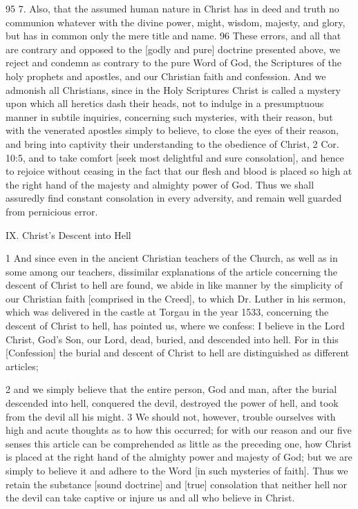 {95 7. Also, that the assumed human nature in Christ has in deed and truth no communion whatever with the divine power, might, wisdom, majesty, and glory, but has in common only the mere title and name.
96 These errors, and all that are contrary and opposed to the [godly and pure] doctrine presented above, we reject and condemn as contrary to the pure Word of God, the Scriptures of the holy prophets and apostles, and our Christian faith and confession. And we admonish all Christians, since in the Holy Scriptures Christ is called a mystery upon which all heretics dash their heads, not to indulge in a presumptuous manner in subtile inquiries, concerning such mysteries, with their reason, but with the venerated apostles simply to believe, to close the eyes of their reason, and bring into captivity their understanding to the obedience of Christ, 2 Cor. 10:5, and to take comfort [seek most delightful and sure consolation], and hence to rejoice without ceasing in the fact that our flesh and blood is placed so high at the right hand of the majesty and almighty power of God. Thus we shall assuredly find constant consolation in every adversity, and remain well guarded from pernicious error.

IX. Christ’s Descent into Hell

1 And since even in the ancient Christian teachers of the Church, as well as in some among our teachers, dissimilar explanations of the article concerning the descent of Christ to hell are found, we abide in like manner by the simplicity of our Christian faith [comprised in the Creed], to which Dr. Luther in his sermon, which was delivered in the castle at Torgau in the year 1533, concerning the descent of Christ to hell, has pointed us, where we confess: I believe in the Lord Christ, God’s Son, our Lord, dead, buried, and descended into hell. For in this [Confession] the burial and descent of Christ to hell are distinguished as different articles;

2 and we simply believe that the entire person, God and man, after the burial descended into hell, conquered the devil, destroyed the power of hell, and took from the devil all his might.
3 We should not, however, trouble ourselves with high and acute thoughts as to how this occurred; for with our reason and our five senses this article can be comprehended as little as the preceding one, how Christ is placed at the right hand of the almighty power and majesty of God; but we are simply to believe it and adhere to the Word [in such mysteries of faith]. Thus we retain the substance [sound doctrine] and [true] consolation that neither hell nor the devil can take captive or injure us and all who believe in Christ.

}
